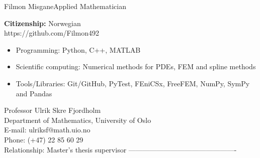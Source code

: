 \documentclass{article}
\begin{document}
\begin{cv}{Filmon Misgane}{Applied Mathematician}

    \cvsidebar %
    \textbf{Citizenship:} Norwegian \\
    https://github.com/Filmon492

    \begin{itemize}
        \item Programming: Python, C++, MATLAB
        \item Scientific computing: Numerical methods for PDEs, FEM and spline methods
        \item Tools/Libraries: Git/GitHub, PyTest, FEniCSx, FreeFEM, NumPy, SymPy and Pandas
    \end{itemize}
    \cvseparator
    Professor Ulrik Skre Fjordholm  \\
    Department of Mathematics, University of Oslo  \\
    E-mail: ulriksf@math.uio.no  \\
    Phone: (+47) 22 85 60 29  \\
    Relationship: Master's thesis supervisor
    ----------------------------------------------\\
\end{cv}
\end{document}

